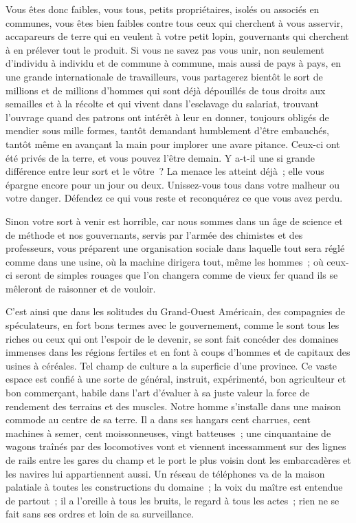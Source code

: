 \documentclass[french,twoside]{book} %
\begin{document}
Vous êtes donc faibles, vous tous, petits propriétaires, isolés ou associés en communes, vous êtes bien faibles contre tous ceux qui cherchent à vous asservir, accapareurs de terre qui en veulent à votre petit lopin, gouvernants qui cherchent à en prélever tout le produit. Si vous ne savez pas vous unir, non seulement d’individu à individu et de  commune à commune, mais aussi de pays à pays, en une grande internationale de travailleurs, vous partagerez bientôt le sort de millions et de millions d’hommes qui sont déjà dépouillés de tous droits aux semailles et à la récolte et qui vivent dans l’esclavage du salariat, trouvant l’ouvrage quand des patrons ont intérêt à leur en donner, toujours obligés de mendier sous mille formes, tantôt demandant humblement d’être embauchés, tantôt même en avançant la main pour implorer une avare pitance. Ceux-ci ont été privés de la terre, et vous pouvez l’être demain. Y a-t-il une si grande différence entre leur sort et le vôtre ? La menace les atteint déjà ; elle vous épargne encore pour un jour ou deux. Unissez-vous tous dans votre malheur ou votre danger. Défendez ce qui vous reste et reconquérez ce que vous avez perdu.\par
Sinon votre sort à venir est horrible, car nous sommes dans un âge de science et de méthode et nos gouvernants, servis par l’armée des chimistes et des professeurs, vous préparent une organisation sociale dans laquelle tout sera réglé comme dans une usine, où la machine dirigera tout, même les hommes ; où ceux-ci seront de simples rouages que l’on changera comme de vieux fer quand  ils se mêleront de raisonner et de vouloir.\par
C’est ainsi que dans les solitudes du Grand-Ouest Américain, des compagnies de spéculateurs, en fort bons termes avec le gouvernement, comme le sont tous les riches ou ceux qui ont l’espoir de le devenir, se sont fait concéder des domaines immenses dans les régions fertiles et en font à coups d’hommes et de capitaux des usines à céréales. Tel champ de culture a la superficie d’une province. Ce vaste espace est confié à une sorte de général, instruit, expérimenté, bon agriculteur et bon commerçant, habile dans l’art d’évaluer à sa juste valeur la force de rendement des terrains et des muscles. Notre homme s’installe dans une maison commode au centre de sa terre. Il a dans ses hangars cent charrues, cent machines à semer, cent moissonneuses, vingt batteuses ; une cinquantaine de wagons traînés par des locomotives vont et viennent incessamment sur des lignes de rails entre les gares du champ et le port le plus voisin dont les embarcadères et les navires lui appartiennent aussi. Un réseau de téléphones va de la maison palatiale à toutes les constructions du domaine ; la voix du maître est entendue de partout ; il a l’oreille à tous les bruits, le regard à tous les actes ; rien ne se fait sans ses ordres et loin  de sa surveillance.\par
\end{document}
